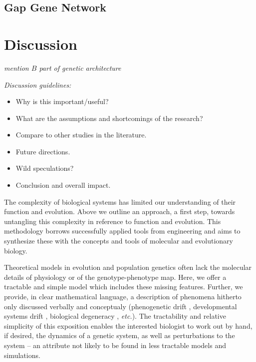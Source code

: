 \documentclass[9 pt]{article}
\newcommand{\plr}[1]{{\color{blue}\it #1}}
\newcommand{\jss}[1]{{\color{olive}\it #1}}
\newcommand{\1}{\mathbbm{1}}
\begin{document}
\begin{multicols}{2}
    \subsection*{Gap Gene Network}

    \section*{Discussion}
      \plr{mention $B$ part of genetic architecture}

      \jss{Discussion guidelines:
        \begin{itemize}
        \item Why is this important/useful?
        \item What are the assumptions and shortcomings of the research?
        \item Compare to other studies in the literature. 
        \item Future directions. 
        \item Wild speculations?
        \item Conclusion and overall impact. 
      \end{itemize}}

  The complexity of biological systems has limited our understanding of their function and evolution. Above we outline an approach, a first step, towards untangling this complexity in reference to function and evolution. This methodology borrows successfully applied tools from engineering and aims to synthesize these with the concepts and tools of molecular and evolutionary biology. 
  
  Theoretical models in evolution and population genetics often lack the molecular details of physiology or of the genotype-phenotype map. Here, we offer a tractable and simple model which includes these missing features. Further, we provide, in clear mathematical language, a description of phenomena hitherto only discussed verbally and conceptualy (phenogenetic drift \citep{weiss2000phenogenetic}, developmental systems drift \citep{true2001developmental}, biological degeneracy \citep{edelman2001degeneracy}, \emph{etc.}). The tractability and relative simplicity of this exposition enables the interested biologist to work out by hand, if desired, the dynamics of a genetic system, as well as perturbations to the system -- an attribute not likely to be found in less tractable models and simulations.


\end{multicols}
\end{document}
